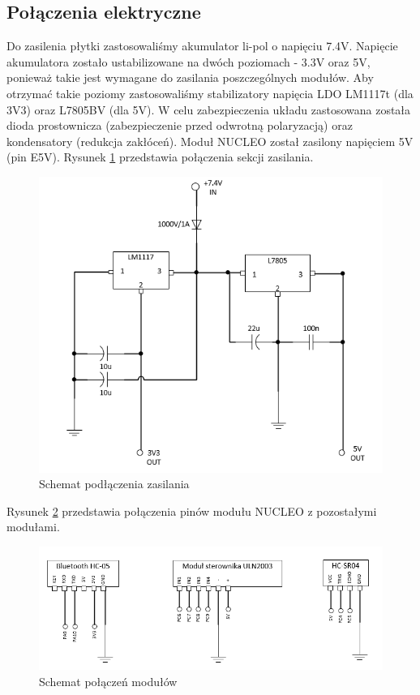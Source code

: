 \documentclass[a4paper]{article}
\begin{document}
\subsection{Połączenia elektryczne}
Do zasilenia płytki zastosowaliśmy akumulator li-pol o napięciu 7.4V. Napięcie akumulatora zostało ustabilizowane na dwóch poziomach - 3.3V oraz 5V, ponieważ takie jest wymagane do zasilania poszczególnych modułów. Aby otrzymać takie poziomy zastosowaliśmy stabilizatory napięcia LDO LM1117t (dla 3V3) oraz L7805BV (dla 5V). W celu zabezpieczenia układu zastosowana została dioda prostownicza (zabezpieczenie przed odwrotną polaryzacją) oraz kondensatory (redukcja zakłóceń). \newline
Moduł NUCLEO został zasilony napięciem 5V (pin E5V). \newline
Rysunek \ref{schem1} przedstawia połączenia sekcji zasilania.
\begin{figure}[H]
\centering
\includegraphics[width=0.8\linewidth]{schem1.png}
\caption{Schemat podłączenia zasilania}
\label{schem1}
\end{figure}
Rysunek \ref{schem2} przedstawia połączenia pinów modułu NUCLEO z pozostałymi modułami.
\begin{figure}[H]
\centering
\includegraphics[width=0.8\linewidth]{schem2.png}
\caption{Schemat połączeń modułów}
\label{schem2}
\end{figure}
\end{document}
